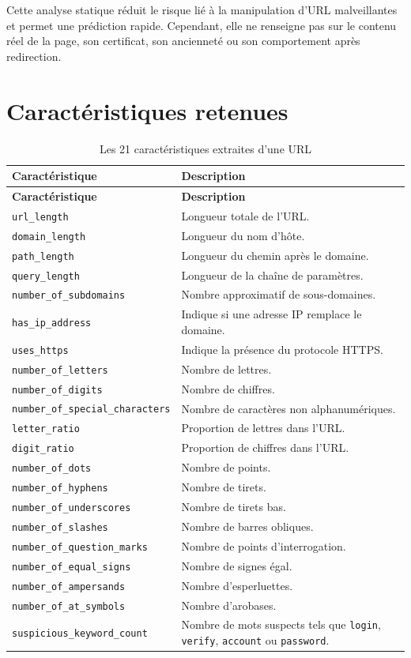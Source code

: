 \documentclass[11pt,a4paper]{report}
\begin{document}
Cette analyse statique réduit le risque lié à la manipulation d'URL
malveillantes et permet une prédiction rapide. Cependant, elle ne renseigne
pas sur le contenu réel de la page, son certificat, son ancienneté ou son
comportement après redirection.

\section{Caractéristiques retenues}

\begin{longtable}{p{}p{}}
\caption{Les 21 caractéristiques extraites d'une URL}\\
\toprule
\textbf{Caractéristique} & \textbf{Description}\\
\midrule
\endfirsthead
\toprule
\textbf{Caractéristique} & \textbf{Description}\\
\midrule
\endhead
\texttt{url\_length} & Longueur totale de l'URL.\\
\texttt{domain\_length} & Longueur du nom d'hôte.\\
\texttt{path\_length} & Longueur du chemin après le domaine.\\
\texttt{query\_length} & Longueur de la chaîne de paramètres.\\
\texttt{number\_of\_subdomains} & Nombre approximatif de sous-domaines.\\
\texttt{has\_ip\_address} & Indique si une adresse IP remplace le domaine.\\
\texttt{uses\_https} & Indique la présence du protocole HTTPS.\\
\texttt{number\_of\_letters} & Nombre de lettres.\\
\texttt{number\_of\_digits} & Nombre de chiffres.\\
\texttt{number\_of\_special\_characters} & Nombre de caractères non alphanumériques.\\
\texttt{letter\_ratio} & Proportion de lettres dans l'URL.\\
\texttt{digit\_ratio} & Proportion de chiffres dans l'URL.\\
\texttt{number\_of\_dots} & Nombre de points.\\
\texttt{number\_of\_hyphens} & Nombre de tirets.\\
\texttt{number\_of\_underscores} & Nombre de tirets bas.\\
\texttt{number\_of\_slashes} & Nombre de barres obliques.\\
\texttt{number\_of\_question\_marks} & Nombre de points d'interrogation.\\
\texttt{number\_of\_equal\_signs} & Nombre de signes égal.\\
\texttt{number\_of\_ampersands} & Nombre d'esperluettes.\\
\texttt{number\_of\_at\_symbols} & Nombre d'arobases.\\
\texttt{suspicious\_keyword\_count} & Nombre de mots suspects tels que
\texttt{login}, \texttt{verify}, \texttt{account} ou \texttt{password}.\\
\bottomrule
\end{longtable}
\end{document}

